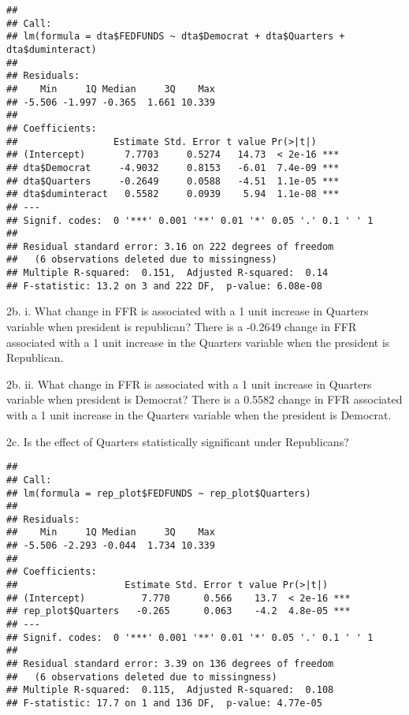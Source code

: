 \documentclass[]{article}
\newenvironment{Shaded}{\begin{snugshade}}{\end{snugshade}}
\newcommand{\KeywordTok}[1]{\textcolor[rgb]{0.13,0.29,0.53}{\textbf{#1}}}
\newcommand{\StringTok}[1]{\textcolor[rgb]{0.31,0.60,0.02}{#1}}
\newcommand{\OperatorTok}[1]{\textcolor[rgb]{0.81,0.36,0.00}{\textbf{#1}}}
\newcommand{\NormalTok}[1]{#1}
\begin{document}
\begin{verbatim}
## 
## Call:
## lm(formula = dta$FEDFUNDS ~ dta$Democrat + dta$Quarters + dta$duminteract)
## 
## Residuals:
##    Min     1Q Median     3Q    Max 
## -5.506 -1.997 -0.365  1.661 10.339 
## 
## Coefficients:
##                 Estimate Std. Error t value Pr(>|t|)    
## (Intercept)       7.7703     0.5274   14.73  < 2e-16 ***
## dta$Democrat     -4.9032     0.8153   -6.01  7.4e-09 ***
## dta$Quarters     -0.2649     0.0588   -4.51  1.1e-05 ***
## dta$duminteract   0.5582     0.0939    5.94  1.1e-08 ***
## ---
## Signif. codes:  0 '***' 0.001 '**' 0.01 '*' 0.05 '.' 0.1 ' ' 1
## 
## Residual standard error: 3.16 on 222 degrees of freedom
##   (6 observations deleted due to missingness)
## Multiple R-squared:  0.151,  Adjusted R-squared:  0.14 
## F-statistic: 13.2 on 3 and 222 DF,  p-value: 6.08e-08
\end{verbatim}

2b. i. What change in FFR is associated with a 1 unit increase in
Quarters variable when president is republican? There is a -0.2649
change in FFR associated with a 1 unit increase in the Quarters variable
when the president is Republican.

2b. ii. What change in FFR is associated with a 1 unit increase in
Quarters variable when president is Democrat? There is a 0.5582 change
in FFR associated with a 1 unit increase in the Quarters variable when
the president is Democrat.

2c. Is the effect of Quarters statistically significant under
Republicans?

\begin{Shaded}
\end{Shaded}

\begin{verbatim}
## 
## Call:
## lm(formula = rep_plot$FEDFUNDS ~ rep_plot$Quarters)
## 
## Residuals:
##    Min     1Q Median     3Q    Max 
## -5.506 -2.293 -0.044  1.734 10.339 
## 
## Coefficients:
##                   Estimate Std. Error t value Pr(>|t|)    
## (Intercept)          7.770      0.566    13.7  < 2e-16 ***
## rep_plot$Quarters   -0.265      0.063    -4.2  4.8e-05 ***
## ---
## Signif. codes:  0 '***' 0.001 '**' 0.01 '*' 0.05 '.' 0.1 ' ' 1
## 
## Residual standard error: 3.39 on 136 degrees of freedom
##   (6 observations deleted due to missingness)
## Multiple R-squared:  0.115,  Adjusted R-squared:  0.108 
## F-statistic: 17.7 on 1 and 136 DF,  p-value: 4.77e-05
\end{verbatim}
\end{document}
